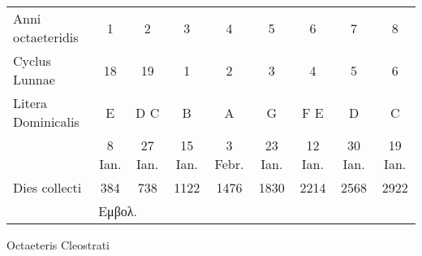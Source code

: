 %
\small
\centering
\setlength{\tabcolsep}{3pt}
\renewcommand{\arraystretch}{1.1}
\begin{tabular}{@{}l cccccccc@{}}
\toprule
Anni octaeteridis &
1\super{†} & 2 & 3\super{†} & 4 & 5 & 6\super{†} & 7 & 8 \\
Cyclus Lunnae &
18 & 19 & 1 & 2 & 3 & 4 & 5 & 6 \\
Litera Dominicalis &
E & D C & B & A & G & F E & D & C \\
~ &
8 Ian. & 27 Ian. & 15 Ian. & 3 Febr. & 23 Ian. & 12 Ian. & 30 Ian. & 19 Ian. \\
Dies collecti &
384 &  738 & 1122 & 1476 & 1830 & 2214 & 2568 & 2922 \\
\bottomrule
\addlinespace
~ & \multicolumn{5}{l}{\footnotesize \super{†} \textgreek{Εμβολ.}}\\
\end{tabular}
%
\caption{Octaeteris Cleostrati}
\label{tab:p065}
